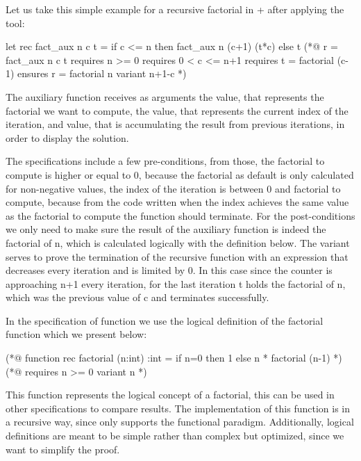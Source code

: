 Let us take this simple example for a recursive factorial in \ocaml + \gospel after applying the \cameleer tool:

\begin{gospell}
let rec fact_aux n c t =
  if c <= n then fact_aux n (c+1) (t*c) else t
(*@
  r = fact_aux n c t
  requires n >= 0
  requires 0 < c <= n+1
  requires t = factorial (c-1)
  ensures r = factorial n
  variant n+1-c
*)
\end{gospell}

The auxiliary function  receives as arguments the  value, that represents the factorial we want to 
compute, the  value, that represents the current index of the iteration, and  value, that is accumulating 
the result from previous iterations, in order to display the solution.

The specifications include a few pre-conditions, from those, the factorial to compute is higher or equal to 0, because the factorial as 
default is only calculated for non-negative values, the index of the iteration is between 0 and factorial to compute, because from the
code written when the index achieves the same value as the factorial to compute the function should terminate. For the post-conditions
we only need to make sure the result of the auxiliary function is indeed the factorial of n, which is calculated logically with the 
definition below. The variant serves to prove the termination of the recursive function with an expression that decreases every iteration
and is limited by 0. In this case since the counter is approaching n+1 every iteration, for the last iteration t holds the factorial of n,
which was the previous value of c and terminates successfully.

In the specification of function  we use the logical definition of the factorial function which we present below:

\begin{gospell}
(*@ 
  function rec factorial (n:int) :int = 
    if n=0 then 1 else n * factorial (n-1)
*)
(*@ 
  requires n >= 0
  variant n
*)
\end{gospell}

This \gospel function represents the logical concept of a factorial, this can be used in other specifications 
to compare results. The implementation of this function is in a recursive way, since \gospel only supports the functional paradigm.
Additionally, logical definitions are meant to be simple rather than complex but optimized, since we want to simplify the proof.

